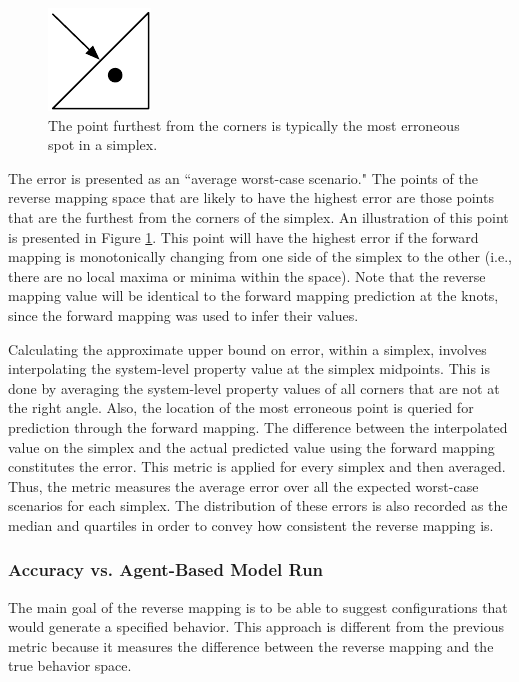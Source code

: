 \begin{figure}[ht]
\centering
\includegraphics[scale=1]{images/mosterror.pdf}
\caption{The point furthest from the corners is typically the most erroneous spot in a simplex.}
\label{fig:mosterror}
\end{figure}

The error is presented as an ``average worst-case scenario."
The points of the reverse mapping space that are likely to have the highest error are those points that are the furthest from the corners of the simplex.
An illustration of this point is presented in Figure \ref{fig:mosterror}.
This point will have the highest error if the forward mapping is monotonically changing from one side of the simplex to the other (i.e., there are no local maxima or minima within the space).
Note that the reverse mapping value will be identical to the forward mapping prediction at the knots, since the forward mapping was used to infer their values.

Calculating the approximate upper bound on error, within a simplex, involves interpolating the system-level property value at the simplex midpoints.
This is done by averaging the system-level property values of all corners that are not at the right angle.
Also, the location of the most erroneous point is queried for prediction through the forward mapping.
The difference between the interpolated value on the simplex and the actual predicted value using the forward mapping constitutes the error.
This metric is applied for every simplex and then averaged.
Thus, the metric measures the average error over all the expected worst-case scenarios for each simplex.
The distribution of these errors is also recorded as the median and quartiles in order to convey how consistent the reverse mapping is.


  \subsubsection{Accuracy vs. Agent-Based Model Run}

The main goal of the reverse mapping is to be able to suggest configurations that would generate a specified behavior.
This approach is different from the previous metric because it measures the difference between the reverse mapping and the true behavior space.

